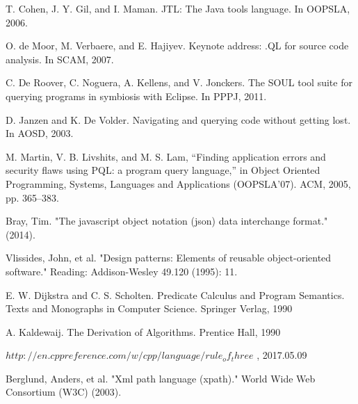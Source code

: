 \documentclass[a4paper,12pt]{report}
\begin{document}
\begin{thebibliography}{99}
	 T. Cohen, J. Y. Gil, and I. Maman. JTL: The Java tools
	language. In OOPSLA, 2006.
	
	 O. de Moor, M. Verbaere, and E. Hajiyev. Keynote address:
	.QL for source code analysis. In SCAM, 2007.
	
	 C. De Roover, C. Noguera, A. Kellens, and V. Jonckers. The
	SOUL tool suite for querying programs in symbiosis with
	Eclipse. In PPPJ, 2011.
	
	 D. Janzen and K. De Volder. Navigating and querying code
	without getting lost. In AOSD, 2003.
	
	  M. Martin, V. B. Livshits, and M. S. Lam, “Finding application
	errors and security flaws using PQL: a program query language,” 
	in Object Oriented Programming, Systems, Languages and Applications (OOPSLA’07). ACM, 2005, pp.	365–383.
	
	Bray, Tim. "The javascript object notation (json) data interchange format." (2014).
	
	 Vlissides, John, et al. "Design patterns: Elements of reusable object-oriented software." Reading: Addison-Wesley 49.120 (1995): 11.
	
	E. W. Dijkstra and C. S. Scholten. Predicate Calculus and
	Program Semantics. Texts and Monographs in Computer
	Science. Springer Verlag, 1990
	
	A. Kaldewaij. The Derivation of Algorithms. Prentice Hall,
	1990
	
	 $http://en.cppreference.com/w/cpp/language/rule_of_three$ , 2017.05.09
	
	 Berglund, Anders, et al. "Xml path language (xpath)." World Wide Web Consortium (W3C) (2003).
	
\end{thebibliography}
	
\end{document}
